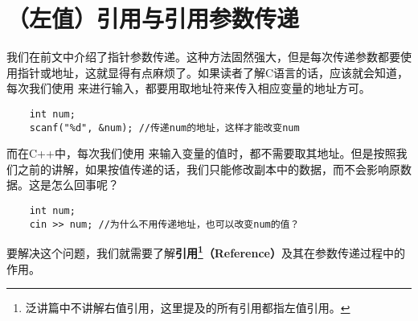 \section{（左值）引用与引用参数传递}
我们在前文中介绍了指针参数传递。这种方法固然强大，但是每次传递参数都要使用指针或地址，这就显得有点麻烦了。如果读者了解C语言的话，应该就会知道，每次我们使用 \lstinline@scanf@ 来进行输入，都要用取地址符来传入相应变量的地址方可。
\begin{lstlisting}
    int num;
    scanf("%d", &num); //传递num的地址，这样才能改变num
\end{lstlisting}\par
而在C++中，每次我们使用 \lstinline@cin@ 来输入变量的值时，都不需要取其地址。但是按照我们之前的讲解，如果按值传递的话，我们只能修改副本中的数据，而不会影响原数据。这是怎么回事呢？
\begin{lstlisting}
    int num;
    cin >> num; //为什么不用传递地址，也可以改变num的值？
\end{lstlisting}\par
要解决这个问题，我们就需要了解\textbf{引用\footnote{泛讲篇中不讲解右值引用，这里提及的所有引用都指左值引用。}（Reference）}及其在参数传递过程中的作用。\par
